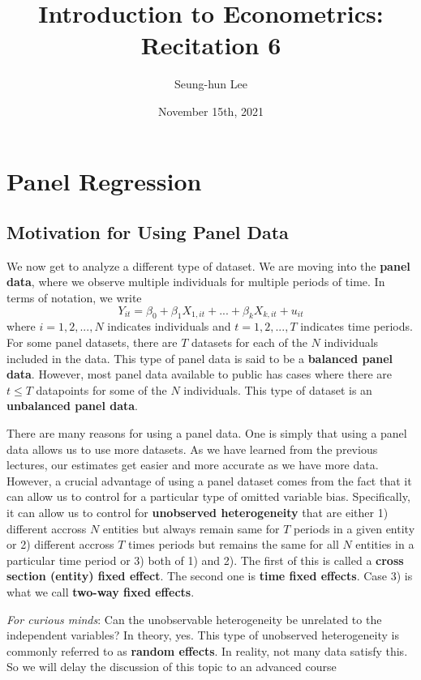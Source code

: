 \documentclass[12pt]{article}
\title{Introduction to Econometrics: Recitation 6}
\theoremstyle{definition}
\theoremstyle{property}
\theoremstyle{assumption}
\theoremstyle{example}
\theoremstyle{comment}
\begin{document}
\linespread{1.25}
\author{Seung-hun Lee}
\date{November 15th, 2021 }
\maketitle

\section{Panel Regression}
\subsection{Motivation for Using Panel Data}
We now get to analyze a different type of dataset. We are moving into the \textbf{panel data}, where we observe multiple individuals for multiple periods of time. In terms of notation, we write
\[
Y_{it} = \beta_0 + \beta_1X_{1,it}+ ... +\beta_kX_{k,it}+u_{it}
\]
where $i=1,2,...,N$ indicates individuals and $t=1,2,...,T$ indicates time periods. For some panel datasets, there are $T$ datasets for each of the $N$ individuals included in the data. This type of panel data is said to be a \textbf{balanced panel data}. However, most panel data available to public has cases where there are $t\leq T$ datapoints for some of the $N$ individuals. This type of dataset is an \textbf{unbalanced panel data}. \par\medskip
There are many reasons for using a panel data. One is simply that using a panel data allows us to use more datasets. As we have learned from the previous lectures, our estimates get easier and more accurate as we have more data. However, a crucial advantage of using a panel dataset comes from the fact that it can allow us to control for a particular type of omitted variable bias. Specifically, it can allow us to control for \textbf{unobserved heterogeneity} that are either 1) different accross $N$ entities but always remain same for $T$ periods in a given entity or 2) different accross $T$ times periods but remains the same for all $N$ entities in a particular time period or 3) both of 1) and 2). The first of this is called a \textbf{cross section (entity) fixed effect}. The second one is \textbf{time fixed effects}. Case 3) is what we call \textbf{two-way fixed effects}.\par\medskip
\begin{mdframed}[backgroundcolor =blue!10]
\textit{For curious minds}: Can the unobservable heterogeneity be unrelated to the independent variables? In theory, yes. This type of unobserved heterogeneity is commonly referred to as \textbf{random effects}. In reality, not many data satisfy this. So we will delay the discussion of this topic to an advanced course 
\end{mdframed} \par\medskip
\end{document}
